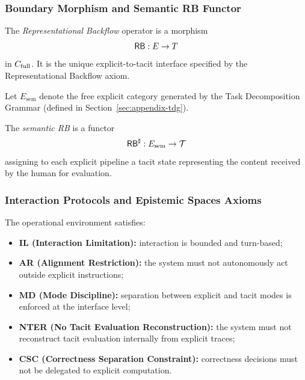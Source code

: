 \subsubsection{Boundary Morphism and Semantic RB Functor}

\begin{definition}
The \emph{Representational Backflow} operator is a morphism
\[
\mathsf{RB} : E \to T
\]
in \(C_{\mathrm{full}}\). It is the unique explicit-to-tacit interface specified by
the Representational Backflow axiom.
\end{definition}

Let \(E_{\mathrm{sem}}\) denote the free explicit category generated by the
Task Decomposition Grammar (defined in Section~\ref{sec:appendix-tdg}).

\begin{definition}
The \emph{semantic RB} is a functor
\[
\mathsf{RB}^{\sharp} : E_{\mathrm{sem}} \to \mathcal{T}
\]
assigning to each explicit pipeline a tacit state representing the content
received by the human for evaluation.
\end{definition}

\subsubsection{Interaction Protocols and Epistemic Spaces Axioms}

\begin{definition}
The operational environment satisfies:
\begin{itemize}
  \item \textbf{IL (Interaction Limitation):} interaction is bounded and turn-based;
  \item \textbf{AR (Alignment Restriction):} the system must not autonomously act
        outside explicit instructions;
  \item \textbf{MD (Mode Discipline):} separation between explicit and tacit modes
        is enforced at the interface level;
  \item \textbf{NTER (No Tacit Evaluation Reconstruction):} the system must not
        reconstruct tacit evaluation internally from explicit traces;
  \item \textbf{CSC (Correctness Separation Constraint):} correctness decisions
        must not be delegated to explicit computation.
\end{itemize}
\end{definition}

